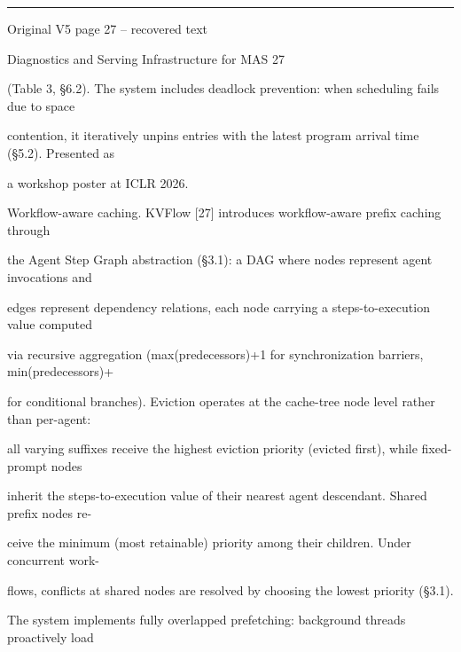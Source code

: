 \par\smallskip\noindent\rule{\textwidth}{0.4pt}\par{\sffamily\footnotesize Original V5 page 27 -- recovered text}\par\begin{flushleft}\footnotesize\ttfamily
\par\smallskip
\par\smallskip
\noindent Diagnostics and Serving Infrastructure for MAS 27\par
\par\smallskip
\par\smallskip
\par\smallskip
\noindent (Table 3, §6.2). The system includes deadlock prevention: when scheduling fails due to space\par
\noindent contention, it iteratively unpins entries with the latest program arrival time (§5.2). Presented as\par
\noindent a workshop poster at ICLR 2026.\par
\par\smallskip
\noindent Workflow-aware caching. KVFlow [27] introduces workflow-aware prefix caching through\par
\noindent the Agent Step Graph abstraction (§3.1): a DAG where nodes represent agent invocations and\par
\noindent edges represent dependency relations, each node carrying a steps-to-execution value computed\par
\noindent via recursive aggregation (max(predecessors)+1 for synchronization barriers, min(predecessors)+\par
{} for conditional branches). Eviction operates at the cache-tree node level rather than per-agent:\par
\noindent all varying suffixes receive the highest eviction priority (evicted first), while fixed-prompt nodes\par
\noindent inherit the steps-to-execution value of their nearest agent descendant. Shared prefix nodes re-\par
\noindent ceive the minimum (most retainable) priority among their children. Under concurrent work-\par
\noindent flows, conflicts at shared nodes are resolved by choosing the lowest priority (§3.1).\par
\noindent  The system implements fully overlapped prefetching: background threads proactively load\par

\end{flushleft}

